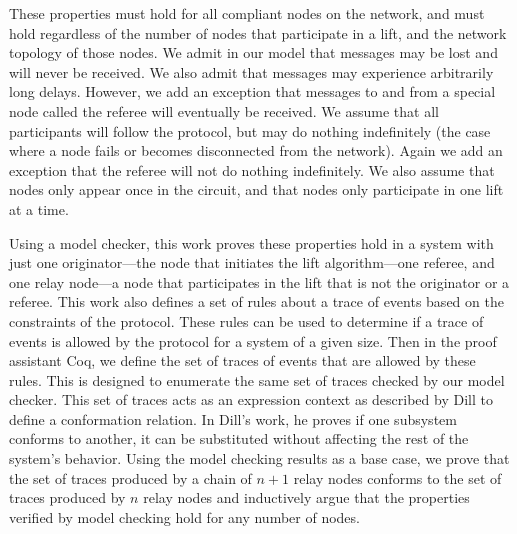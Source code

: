 \documentclass[runningheads]{llncs}
\newcommand{\coq}{Coq}
\begin{document}
These properties must hold for all compliant nodes on the network, and must hold regardless of the number of nodes that participate in a lift, and the network topology of those nodes. We admit in our model that messages may be lost and will never be received. We also admit that messages may experience arbitrarily long delays. However, we add an exception that messages to and from a special node called the referee will eventually be received.  We assume that all participants will follow the protocol, but may do nothing indefinitely (the case where a node fails or becomes disconnected from the network). Again we add an exception that the referee will not do nothing indefinitely. We also assume that nodes only appear once in the circuit, and that nodes only participate in one lift at a time. 

Using a model checker, this work proves these properties hold in a system with just one originator---the node that initiates the lift algorithm---one referee, and one relay node---a node that participates in the lift that is not the originator or a referee. This work also defines a set of rules about a trace of events based on the constraints of the protocol. These rules can be used to determine if a trace of events is allowed by the protocol for a system of a given size. 
Then in the proof assistant \coq, we define the set of traces of events that are allowed by these rules. This is designed to enumerate the same set of traces checked by our model checker. This set of traces acts as an expression context as described by Dill \cite{dill_trace_theory} to define a conformation relation. In Dill's work, he proves if one subsystem conforms to another, it can be substituted without affecting the rest of the system's behavior. 
Using the model checking results as a base case, we prove that the set of traces produced by a chain of $n+1$ relay nodes conforms to the set of traces produced by $n$ relay nodes and inductively argue that the properties verified by model checking hold for any number of nodes.
\end{document}
